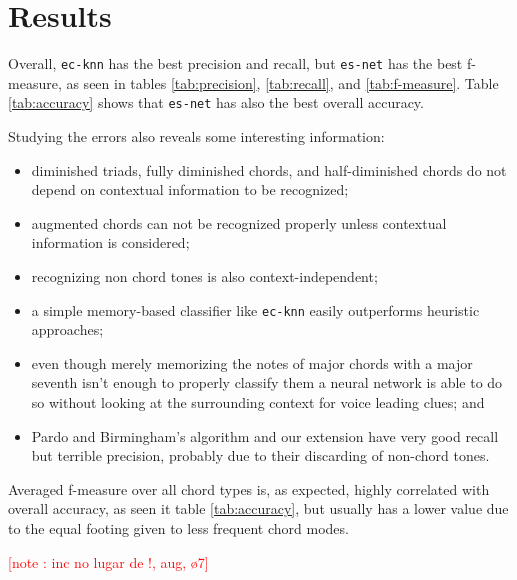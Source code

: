 \documentclass{article}
\newcounter{notecounter}
\newcommand{\note}[1]{
  \addtocounter{notecounter}{1}
  \textcolor{red}{[note \arabic{notecounter}: #1]}
}
\begin{document}
\section{Results}
\label{sec:discussion}


Overall, \texttt{ec-knn} has the best precision and recall, but
\texttt{es-net} has the best f-measure, as seen in tables
\ref{tab:precision}, \ref{tab:recall}, and \ref{tab:f-measure}. Table
\ref{tab:accuracy} shows that \texttt{es-net} has also the best
overall accuracy.

Studying the errors also reveals some interesting information:
\begin{itemize}
\item diminished triads, fully diminished chords, and half-diminished
  chords do not depend on contextual information to be recognized;
\item augmented chords can not be recognized properly unless
  contextual information is considered;
\item recognizing non chord tones is also context-independent;
\item a simple memory-based classifier like \texttt{ec-knn}
  easily outperforms heuristic approaches;
\item even though merely memorizing the notes of major chords with a major seventh
  isn't enough to properly classify them a neural network is able to
  do so without looking at the surrounding context for voice leading
  clues; and
\item Pardo and Birmingham's algorithm and our extension have very
  good recall but terrible precision, probably due to their discarding
  of non-chord tones.
\end{itemize}

Averaged f-measure over all chord types is, as expected, highly
correlated with overall accuracy, as seen it table \ref{tab:accuracy},
but usually has a lower value due to the equal footing given to less
frequent chord modes.

\note{inc no lugar de !, aug, ø7}
\end{document}
